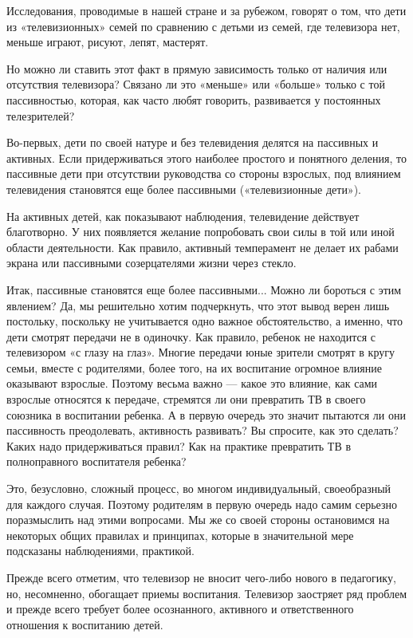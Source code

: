 \documentclass[12pt, a4paper, openany]{book}
\begin{document}
Исследования, проводимые в нашей стране и за рубежом, говорят о том, что дети из «телевизионных» семей по сравнению с детьми из семей, где телевизора нет, меньше играют, рисуют, лепят, мастерят. 

Но можно ли ставить этот факт в прямую зависимость только от наличия или отсутствия телевизора? Связано ли это «меньше» или «больше» только с той пассивностью, которая, как часто любят говорить, развивается у постоянных телезрителей? 

Во-первых, дети по своей натуре и без телевидения делятся на пассивных и активных. Если придерживаться этого наиболее простого и понятного деления, то пассивные дети при отсутствии руководства со стороны взрослых, под влиянием телевидения становятся еще более пассивными («телевизионные дети»). 

На активных детей, как показывают наблюдения, телевидение действует благотворно. У них появляется желание попробовать свои силы в той или иной области деятельности. Как правило, активный темперамент не делает их рабами экрана или пассивными созерцателями жизни через стекло.

Итак, пассивные становятся еще более пассивными... Можно ли бороться с этим явлением? Да, мы решительно хотим подчеркнуть, что этот вывод верен лишь постольку, поскольку не учитывается одно важное обстоятельство, а именно, что дети смотрят передачи не в одиночку. Как правило, ребенок не находится с телевизором «с глазу на глаз». Многие передачи юные зрители смотрят в кругу семьи, вместе с родителями, более того, на их воспитание огромное влияние оказывают взрослые. Поэтому весьма важно — какое это влияние, как сами взрослые относятся к передаче, стремятся ли они превратить ТВ в своего союзника в воспитании ребенка. А в первую очередь это значит пытаются ли они пассивность преодолевать, активность развивать? Вы спросите, как это сделать? Каких надо придерживаться правил? Как на практике превратить ТВ в полноправного воспитателя ребенка? 

Это, безусловно, сложный процесс, во многом индивидуальный, своеобразный для каждого случая. Поэтому родителям в первую очередь надо самим серьезно поразмыслить над этими вопросами. Мы же со своей стороны остановимся на некоторых общих правилах и принципах, которые в значительной мере подсказаны наблюдениями, практикой. 

Прежде всего отметим, что телевизор не вносит чего-либо нового в педагогику, но, несомненно, обогащает приемы воспитания. Телевизор заостряет ряд проблем и прежде всего требует более осознанного, активного и ответственного отношения к воспитанию детей. 
\end{document}
